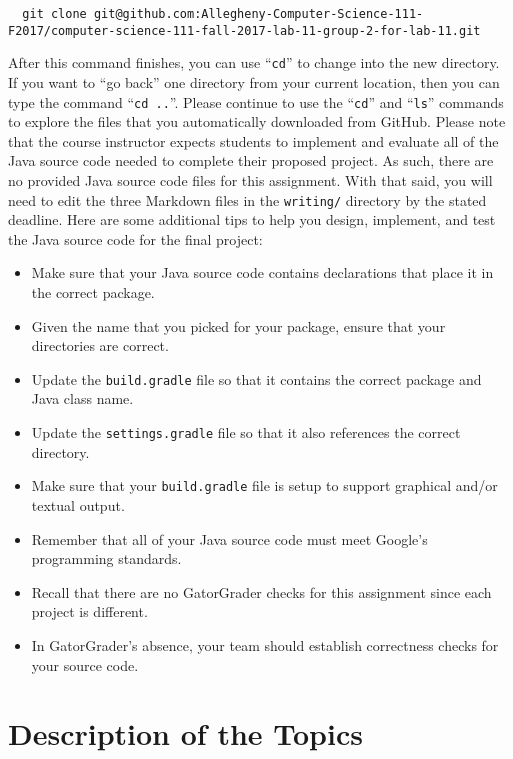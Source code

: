 \documentclass[11pt]{article}
\newcommand{\command}[1]{``\lstinline{#1}''}
\newcommand{\program}[1]{\lstinline{#1}}
\newcommand{\step}[1]{``{#1}''}
\begin{document}
\begin{lstlisting}
  git clone git@github.com:Allegheny-Computer-Science-111-F2017/computer-science-111-fall-2017-lab-11-group-2-for-lab-11.git
\end{lstlisting}

After this command finishes, you can use \command{cd} to change into the new directory. If you want to \step{go back}
one directory from your current location, then you can type the command \command{cd ..}. Please continue to use the
\command{cd} and \command{ls} commands to explore the files that you automatically downloaded from GitHub. Please note
that the course instructor expects students to implement and evaluate all of the Java source code needed to complete
their proposed project. As such, there are no provided Java source code files for this assignment. With that said, you
will need to edit the three Markdown files in the \program{writing/} directory by the stated deadline. Here are some
additional tips to help you design, implement, and test the Java source code for the final project:

\begin{itemize}
  \item Make sure that your Java source code contains declarations that place it in the correct package.
  \item Given the name that you picked for your package, ensure that your directories are correct.
  \item Update the \program{build.gradle} file so that it contains the correct package and Java class name.
  \item Update the \program{settings.gradle} file so that it also references the correct directory.
  \item Make sure that your \program{build.gradle} file is setup to support graphical and/or textual output.
  \item Remember that all of your Java source code must meet Google's programming standards.
  \item Recall that there are no GatorGrader checks for this assignment since each project is different.
  \item In GatorGrader's absence, your team should establish correctness checks for your source code.
\end{itemize}

\section*{Description of the Topics}
\end{document}
